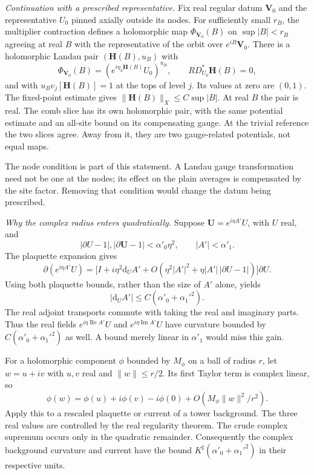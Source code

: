 \documentclass[11pt,letterpaper,reqno]{amsart}
\theoremstyle{definition}
\theoremstyle{remark}
\begin{document}
\emph{Continuation with a prescribed representative.}
Fix real regular datum $\mathbf V_0$ and the representative
$U_0$ pinned axially outside its nodes. For sufficiently small
$r_B$, the multiplier contraction defines a holomorphic map
$\Phi_{\mathbf V_0}(B)$ on $\sup|B|<r_B$ agreeing at real
$B$ with the representative of the orbit over
$e^{iB}\mathbf V_0$. There is a holomorphic Landau pair
$(\mathbf H(B),u_B)$ with
\[
 \Phi_{\mathbf V_0}(B)
       =(e^{i\eta_k\mathbf H(B)}U_0)^{u_B},\qquad
 RD_{U_0}^*\mathbf H(B)=0,
\]
and with $u_Bv_j[\mathbf H(B)]=1$ at the tops of level
$j$. Its values at zero are $(0,1)$. The fixed-point
estimate gives $\|\mathbf H(B)\|_X\le C\sup|B|$.
At real $B$ the pair is real. The comb slice has its own
holomorphic pair, with the same potential estimate and
an all-site bound on its compensating gauge. At the
trivial reference the two slices agree. Away from it,
they are two gauge-related potentials, not equal maps.

The node condition is part of this statement. A Landau
gauge transformation need not be one at the nodes;
its effect on the plain averages is compensated by
the site factor. Removing that condition would change
the datum being prescribed.

\emph{Why the complex radius enters quadratically.}
Suppose $\mathbf U=e^{i\eta A'}U$, with $U$ real, and
\[
 |\partial U-1|,|\partial\mathbf U-1|<\alpha'_0\eta^2,
 \qquad |A'|<\alpha'_1.
\]
The plaquette expansion gives
\[
 \partial(e^{i\eta A'}U)
 =\big[I+i\eta^2\mathrm d_UA'
       +O(\eta^2|A'|^2+\eta|A'|\,|\partial U-1|)\big]
                                                    \partial U.
\]
Using both plaquette bounds, rather than the size of
$A'$ alone, yields
\[
 |\mathrm d_UA'|\le C(\alpha'_0+\alpha_1'^2).
\]
The real adjoint transports commute with taking the
real and imaginary parts. Thus the real fields
$e^{i\eta\operatorname{Re}A'}U$ and
$e^{i\eta\operatorname{Im}A'}U$ have curvature bounded
by $C(\alpha'_0+\alpha_1'^2)$ as well. A bound merely
linear in $\alpha'_1$ would miss this gain.

For a holomorphic component $\phi$ bounded by $M_\phi$
on a ball of radius $r$, let $w=u+iv$ with $u,v$ real
and $\|w\|\le r/2$. Its first Taylor term is complex
linear, so
\[
 \phi(w)=\phi(u)+i\phi(v)-i\phi(0)
                   +O(M_\phi\|w\|^2/r^2).
\]
Apply this to a rescaled plaquette or current of a
tower background. The three real values are controlled
by the real regularity theorem. The crude complex
supremum occurs only in the quadratic remainder.
Consequently the complex background curvature and
current have the bound
$K^\sharp(\alpha'_0+\alpha_1'^2)$ in their respective
units.
\end{document}
